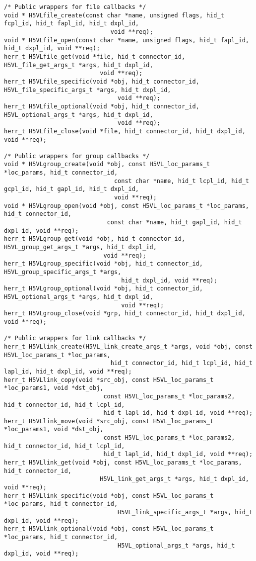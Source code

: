 \begin{appendices}
\begin{lstlisting}
/* Public wrappers for file callbacks */
void * H5VLfile_create(const char *name, unsigned flags, hid_t fcpl_id, hid_t fapl_id, hid_t dxpl_id,
                              void **req);
void * H5VLfile_open(const char *name, unsigned flags, hid_t fapl_id, hid_t dxpl_id, void **req);
herr_t H5VLfile_get(void *file, hid_t connector_id, H5VL_file_get_args_t *args, hid_t dxpl_id,
                           void **req);
herr_t H5VLfile_specific(void *obj, hid_t connector_id, H5VL_file_specific_args_t *args, hid_t dxpl_id,
                                void **req);
herr_t H5VLfile_optional(void *obj, hid_t connector_id, H5VL_optional_args_t *args, hid_t dxpl_id,
                                void **req);
herr_t H5VLfile_close(void *file, hid_t connector_id, hid_t dxpl_id, void **req);

/* Public wrappers for group callbacks */
void * H5VLgroup_create(void *obj, const H5VL_loc_params_t *loc_params, hid_t connector_id,
                               const char *name, hid_t lcpl_id, hid_t gcpl_id, hid_t gapl_id, hid_t dxpl_id,
                               void **req);
void * H5VLgroup_open(void *obj, const H5VL_loc_params_t *loc_params, hid_t connector_id,
                             const char *name, hid_t gapl_id, hid_t dxpl_id, void **req);
herr_t H5VLgroup_get(void *obj, hid_t connector_id, H5VL_group_get_args_t *args, hid_t dxpl_id,
                            void **req);
herr_t H5VLgroup_specific(void *obj, hid_t connector_id, H5VL_group_specific_args_t *args,
                                 hid_t dxpl_id, void **req);
herr_t H5VLgroup_optional(void *obj, hid_t connector_id, H5VL_optional_args_t *args, hid_t dxpl_id,
                                 void **req);
herr_t H5VLgroup_close(void *grp, hid_t connector_id, hid_t dxpl_id, void **req);

/* Public wrappers for link callbacks */
herr_t H5VLlink_create(H5VL_link_create_args_t *args, void *obj, const H5VL_loc_params_t *loc_params,
                              hid_t connector_id, hid_t lcpl_id, hid_t lapl_id, hid_t dxpl_id, void **req);
herr_t H5VLlink_copy(void *src_obj, const H5VL_loc_params_t *loc_params1, void *dst_obj,
                            const H5VL_loc_params_t *loc_params2, hid_t connector_id, hid_t lcpl_id,
                            hid_t lapl_id, hid_t dxpl_id, void **req);
herr_t H5VLlink_move(void *src_obj, const H5VL_loc_params_t *loc_params1, void *dst_obj,
                            const H5VL_loc_params_t *loc_params2, hid_t connector_id, hid_t lcpl_id,
                            hid_t lapl_id, hid_t dxpl_id, void **req);
herr_t H5VLlink_get(void *obj, const H5VL_loc_params_t *loc_params, hid_t connector_id,
                           H5VL_link_get_args_t *args, hid_t dxpl_id, void **req);
herr_t H5VLlink_specific(void *obj, const H5VL_loc_params_t *loc_params, hid_t connector_id,
                                H5VL_link_specific_args_t *args, hid_t dxpl_id, void **req);
herr_t H5VLlink_optional(void *obj, const H5VL_loc_params_t *loc_params, hid_t connector_id,
                                H5VL_optional_args_t *args, hid_t dxpl_id, void **req);


\end{lstlisting}
\end{appendices}
